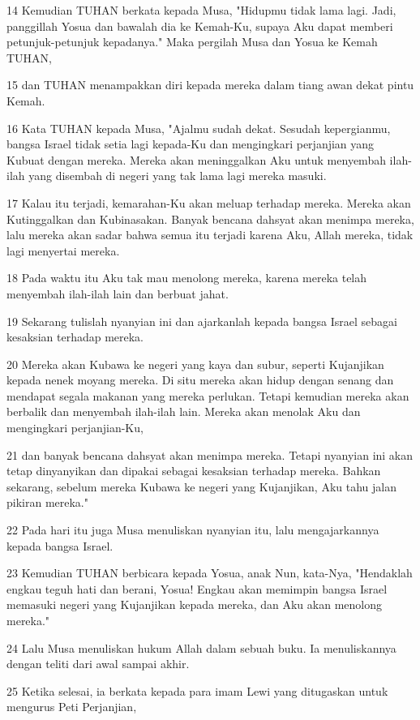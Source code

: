 \par 14 Kemudian TUHAN berkata kepada Musa, "Hidupmu tidak lama lagi. Jadi, panggillah Yosua dan bawalah dia ke Kemah-Ku, supaya Aku dapat memberi petunjuk-petunjuk kepadanya." Maka pergilah Musa dan Yosua ke Kemah TUHAN,
\par 15 dan TUHAN menampakkan diri kepada mereka dalam tiang awan dekat pintu Kemah.
\par 16 Kata TUHAN kepada Musa, "Ajalmu sudah dekat. Sesudah kepergianmu, bangsa Israel tidak setia lagi kepada-Ku dan mengingkari perjanjian yang Kubuat dengan mereka. Mereka akan meninggalkan Aku untuk menyembah ilah-ilah yang disembah di negeri yang tak lama lagi mereka masuki.
\par 17 Kalau itu terjadi, kemarahan-Ku akan meluap terhadap mereka. Mereka akan Kutinggalkan dan Kubinasakan. Banyak bencana dahsyat akan menimpa mereka, lalu mereka akan sadar bahwa semua itu terjadi karena Aku, Allah mereka, tidak lagi menyertai mereka.
\par 18 Pada waktu itu Aku tak mau menolong mereka, karena mereka telah menyembah ilah-ilah lain dan berbuat jahat.
\par 19 Sekarang tulislah nyanyian ini dan ajarkanlah kepada bangsa Israel sebagai kesaksian terhadap mereka.
\par 20 Mereka akan Kubawa ke negeri yang kaya dan subur, seperti Kujanjikan kepada nenek moyang mereka. Di situ mereka akan hidup dengan senang dan mendapat segala makanan yang mereka perlukan. Tetapi kemudian mereka akan berbalik dan menyembah ilah-ilah lain. Mereka akan menolak Aku dan mengingkari perjanjian-Ku,
\par 21 dan banyak bencana dahsyat akan menimpa mereka. Tetapi nyanyian ini akan tetap dinyanyikan dan dipakai sebagai kesaksian terhadap mereka. Bahkan sekarang, sebelum mereka Kubawa ke negeri yang Kujanjikan, Aku tahu jalan pikiran mereka."
\par 22 Pada hari itu juga Musa menuliskan nyanyian itu, lalu mengajarkannya kepada bangsa Israel.
\par 23 Kemudian TUHAN berbicara kepada Yosua, anak Nun, kata-Nya, "Hendaklah engkau teguh hati dan berani, Yosua! Engkau akan memimpin bangsa Israel memasuki negeri yang Kujanjikan kepada mereka, dan Aku akan menolong mereka."
\par 24 Lalu Musa menuliskan hukum Allah dalam sebuah buku. Ia menuliskannya dengan teliti dari awal sampai akhir.
\par 25 Ketika selesai, ia berkata kepada para imam Lewi yang ditugaskan untuk mengurus Peti Perjanjian,

